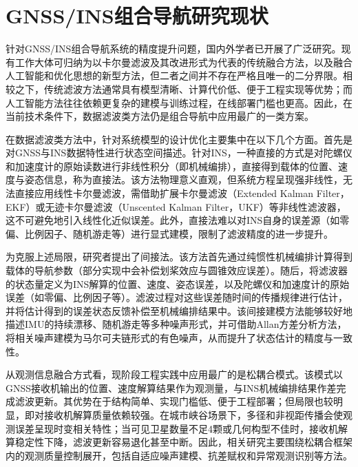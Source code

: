 



\section{GNSS/INS组合导航研究现状}

针对GNSS/INS组合导航系统的精度提升问题，国内外学者已开展了广泛研究。现有工作大体可归纳为以卡尔曼滤波及其改进形式为代表的传统融合方法，以及融合人工智能和优化思想的新型方法，但二者之间并不存在严格且唯一的二分界限\cite{Noureldin2011,Ahmed2011}。相较之下，传统滤波方法通常具有模型清晰、计算代价低、便于工程实现等优势；而人工智能方法往往依赖更复杂的建模与训练过程，在线部署门槛也更高\cite{Noureldin2011,Ahmed2011}。因此，在当前技术条件下，数据滤波类方法仍是组合导航中应用最广的一类方案。


在数据滤波类方法中，针对系统模型的设计优化主要集中在以下几个方面。首先是对GNSS与INS数据特性进行状态空间描述。针对INS，一种直接的方式是对陀螺仪和加速度计的原始读数进行非线性积分（即机械编排），直接得到载体的位置、速度与姿态信息，称为直接法\cite{hu2018new}。该方法物理意义直观，但系统方程呈现强非线性，无法直接应用线性卡尔曼滤波，需借助扩展卡尔曼滤波（Extended Kalman Filter，EKF）或无迹卡尔曼滤波（Unscented Kalman Filter，UKF）等非线性滤波器，这不可避免地引入线性化近似误差。此外，直接法难以对INS自身的误差源（如零偏、比例因子、随机游走等）进行显式建模，限制了滤波精度的进一步提升。

为克服上述局限，研究者提出了间接法。该方法首先通过纯惯性机械编排计算得到载体的导航参数（部分实现中会补偿划桨效应与圆锥效应误差）。随后，将滤波器的状态量定义为INS解算的位置、速度、姿态误差，以及陀螺仪和加速度计的原始误差（如零偏、比例因子等）\cite{yan2019strapdown}。滤波过程对这些误差随时间的传播规律进行估计，并将估计得到的误差状态反馈补偿至机械编排结果中。该间接建模方法能够较好地描述IMU的持续漂移、随机游走等多种噪声形式，并可借助Allan方差分析方法，将相关噪声建模为马尔可夫链形式的有色噪声，从而提升了状态估计的精度与一致性\cite{wang2018using,han2010quantization}。

从观测信息融合方式看，现阶段工程实践中应用最广的是松耦合模式。该模式以GNSS接收机输出的位置、速度解算结果作为观测量，与INS机械编排结果作差完成滤波更新\cite{Falco2012}。其优势在于结构简单、实现门槛低、便于工程部署；但局限也较明显，即对接收机解算质量依赖较强。在城市峡谷场景下，多径和非视距传播会使观测误差呈现时变相关特性；当可见卫星数量不足4颗或几何构型不佳时，接收机解算稳定性下降，滤波更新容易退化甚至中断\cite{Dissanayake2001,angrisano2010gnss}。因此，相关研究主要围绕松耦合框架内的观测质量控制展开，包括自适应噪声建模、抗差赋权和异常观测识别等方法\cite{yang2010robust}。

